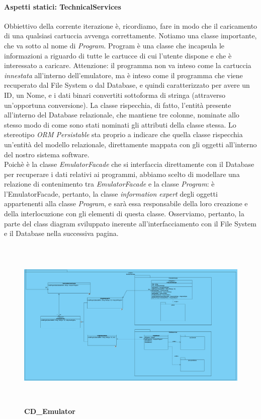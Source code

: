 \documentclass[11pt]{article}
\begin{document}
\paragraph{Aspetti statici: TechnicalServices}
Obbiettivo della corrente iterazione è, ricordiamo, fare in modo che il caricamento di una qualsiasi cartuccia avvenga correttamente. Notiamo una classe importante, che va sotto al nome di \emph{Program}. Program è una classe che incapsula le informazioni a riguardo di tutte le cartucce di cui l'utente dispone e che è interessato a caricare. Attenzione: il programma non va inteso come la cartuccia \emph{innestata} all'interno dell'emulatore, ma è inteso come il programma che viene recuperato dal File System o dal Database, e quindi caratterizzato per avere un ID, un Nome, e i dati binari convertiti sottoforma di stringa (attraverso un'opportuna conversione). La classe rispecchia, di fatto, l'entità presente all'interno del Database relazionale, che mantiene tre colonne, nominate allo stesso modo di come sono stati nominati gli attributi della classe stessa. Lo stereotipo \emph{ORM Persistable} sta proprio a indicare che quella classe rispecchia un'entità del modello relazionale, direttamente mappata con gli oggetti all'interno del nostro sistema software.\\
Poichè è la classe \emph{EmulatorFacade} che si interfaccia direttamente con il Database per recuperare i dati relativi ai programmi, abbiamo scelto di modellare una relazione di contenimento tra \emph{EmulatorFacade} e la classe \emph{Program}: è l'EmulatorFacade, pertanto, la classe \emph{information expert} degli oggetti appartenenti alla classe \emph{Program}, e sarà essa responsabile della loro creazione e della interlocuzione con gli elementi di questa classe. Osserviamo, pertanto, la parte del class diagram sviluppato inerente all'interfacciamento con il File System e il Database nella successiva pagina.
\begin{figure}[!h]
\hspace*{-4.3cm}
\centering
\includegraphics[width=600px, height=315px]{CD_Emulator_3.png}\\
\small\textbf{CD\_Emulator}
\end{figure}\\
\end{document}
